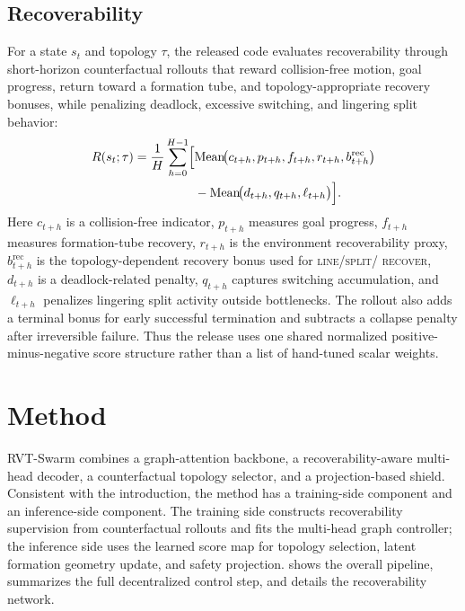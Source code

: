 \documentclass[journal]{IEEEtran}
\begin{document}
\subsection{Recoverability}
For a state $s_t$ and topology $\tau$, the released code evaluates
recoverability through short-horizon counterfactual rollouts that reward
collision-free motion, goal progress, return toward a formation tube,
and topology-appropriate recovery bonuses, while penalizing deadlock,
excessive switching, and lingering split behavior:
\begin{equation}
\begin{aligned}
R(s_t;\tau) = \frac{1}{H}\sum_{h=0}^{H-1}
\Bigl[
 &\mathrm{Mean}\!\bigl(c_{t+h},p_{t+h},f_{t+h},r_{t+h},b^{\mathrm{rec}}_{t+h}\bigr) \\
 &- \mathrm{Mean}\!\bigl(d_{t+h},q_{t+h},\ell_{t+h}\bigr)
\Bigr].
\end{aligned}
\label{eq:recoverability}
\end{equation}
Here $c_{t+h}$ is a collision-free indicator, $p_{t+h}$ measures goal
progress, $f_{t+h}$ measures formation-tube recovery, $r_{t+h}$ is the
environment recoverability proxy, $b^{\mathrm{rec}}_{t+h}$ is the
topology-dependent recovery bonus used for \textsc{line}/\textsc{split}/
\textsc{recover}, $d_{t+h}$ is a deadlock-related penalty, $q_{t+h}$
captures switching accumulation, and $\ell_{t+h}$ penalizes lingering
split activity outside bottlenecks. The rollout also adds a terminal
bonus for early successful termination and subtracts a collapse penalty
after irreversible failure. Thus the release uses one shared normalized
positive-minus-negative score structure rather than a list of
hand-tuned scalar weights.

\section{Method}
\label{sec:method}

RVT-Swarm combines a graph-attention backbone, a recoverability-aware
multi-head decoder, a counterfactual topology selector, and a
projection-based shield. Consistent with the introduction, the method
has a training-side component and an inference-side component. The
training side constructs recoverability supervision from counterfactual
rollouts and fits the multi-head graph controller; the inference side
uses the learned score map for topology selection, latent formation
geometry update, and safety projection.  shows
the overall pipeline,  summarizes the full
decentralized control step, and  details the
recoverability network.
\end{document}
